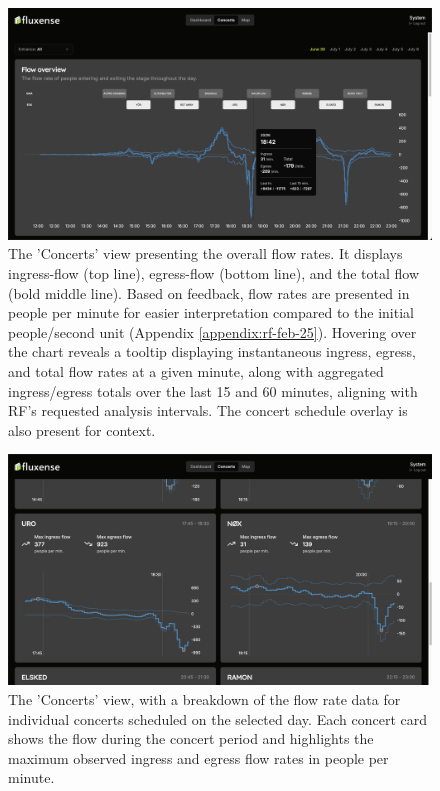 \begin{figure}[H]
  \centering
  \includegraphics[width=\textwidth]{Pictures/Misc/Frontend/flow_total.png}
  \caption{The 'Concerts' view presenting the overall flow rates. It displays ingress-flow (top line), egress-flow (bottom line), and the total flow (bold middle line). Based on feedback, flow rates are presented in people per minute for easier interpretation compared to the initial people/second unit (Appendix \ref{appendix:rf-feb-25}). Hovering over the chart reveals a tooltip displaying instantaneous ingress, egress, and total flow rates at a given minute, along with aggregated ingress/egress totals over the last 15 and 60 minutes, aligning with RF's requested analysis intervals. The concert schedule overlay is also present for context.}
  \label{fig:showcase:flow-total}

\end{figure}

\begin{figure}[H]
  \centering
  \includegraphics[width=\textwidth]{Pictures/Misc/Frontend/flow_concerts.png}
  \caption{The 'Concerts' view, with a breakdown of the flow rate data for individual concerts scheduled on the selected day. Each concert card shows the flow during the concert period and highlights the maximum observed ingress and egress flow rates in people per minute.}
  \label{fig:showcase:concerts}

\end{figure}

